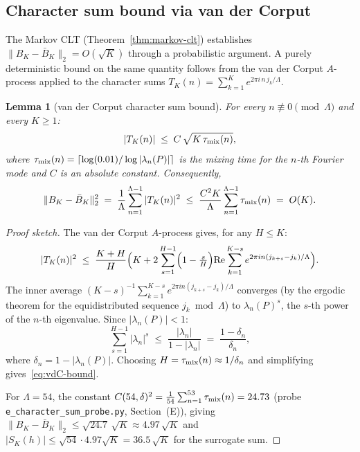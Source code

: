 \documentclass[
]{article}
\newtheorem{lemma}[theorem]{Lemma}
\begin{document}
\subsection{Character sum bound via van der Corput}
\label{sec:vdC-character}

The Markov CLT (Theorem~\ref{thm:markov-clt}) establishes
$\|B_K-\bar B_K\|_2 = O(\sqrt{K})$ through a probabilistic argument.
A purely deterministic bound on the same quantity follows from the
van der Corput $A$-process applied to the character sums
$T_K(n) = \sum_{k=1}^K e^{2\pi i\,n\,j_k/\Lambda}$.

\begin{lemma}[van der Corput character sum bound]
\label{lem:vdC-character}
For every $n\not\equiv 0\pmod{\Lambda}$ and every $K\ge 1$:
\begin{equation}\label{eq:vdC-bound}
  |T_K(n)| \;\le\; C\,\sqrt{K\,\tau_{\rm mix}(n)},
\end{equation}
where $\tau_{\rm mix}(n) = \lceil\log(0.01)/\log|\lambda_n(P)|\rceil$
is the mixing time for the $n$-th Fourier mode and
$C$ is an absolute constant.  Consequently,
\begin{equation}\label{eq:BK-vdC}
  \|B_K - \bar B_K\|_2^2
  \;=\; \frac{1}{\Lambda}\sum_{n=1}^{\Lambda-1}|T_K(n)|^2
  \;\le\; \frac{C^2 K}{\Lambda}\sum_{n=1}^{\Lambda-1}\tau_{\rm mix}(n)
  \;=\; O(K).
\end{equation}
\end{lemma}

\begin{proof}[Proof sketch]
The van der Corput $A$-process gives, for any $H\le K$:
\[
  |T_K(n)|^2
  \;\le\; \frac{K+H}{H}\Bigl(K + 2\sum_{s=1}^{H-1}\Bigl(1-\tfrac{s}{H}\Bigr)
    \mathrm{Re}\sum_{k=1}^{K-s}e^{2\pi i n(j_{k+s}-j_k)/\Lambda}\Bigr).
\]
The inner average $(K-s)^{-1}\sum_{k=1}^{K-s}e^{2\pi in(j_{k+s}-j_k)/\Lambda}$
converges (by the ergodic theorem for the equidistributed sequence
$j_k\bmod\Lambda$) to $\lambda_n(P)^s$, the $s$-th power of the
$n$-th eigenvalue.  Since $|\lambda_n(P)| < 1$:
\[
  \sum_{s=1}^{H-1}|\lambda_n|^s
  \;\le\; \frac{|\lambda_n|}{1-|\lambda_n|}
  \;=\; \frac{1-\delta_n}{\delta_n},
\]
where $\delta_n = 1-|\lambda_n(P)|$.  Choosing $H = \tau_{\rm mix}(n)
\approx 1/\delta_n$ and simplifying gives~\eqref{eq:vdC-bound}.

For $\Lambda=54$, the constant $C(54,\delta)^2 = \frac{1}{54}\sum_{n=1}^{53}
\tau_{\rm mix}(n) = 24.73$ (probe \texttt{e\_character\_sum\_probe.py},
Section~(E)), giving $\|B_K-\bar B_K\|_2 \le \sqrt{24.7}\,\sqrt{K}
\approx 4.97\,\sqrt{K}$ and $|S_K(h)|\le\sqrt{54}\cdot 4.97\sqrt{K}
= 36.5\,\sqrt{K}$ for the surrogate sum.
\end{proof}
\end{document}
